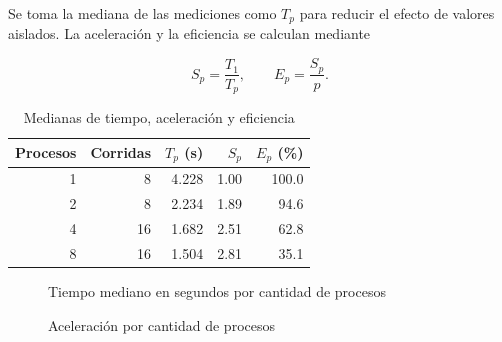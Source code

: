 \documentclass[11pt]{article}
\begin{document}
Se toma la mediana de las mediciones como $T_p$ para reducir el efecto de
valores aislados. La aceleración y la eficiencia se calculan mediante

\begin{equation}
    S_p=\frac{T_1}{T_p},
    \qquad
    E_p=\frac{S_p}{p}.
\end{equation}

\begin{table}[htbp]
    \centering
    \begin{tabular}{r|r|r|r|r}
        \hline
        Procesos & Corridas & $T_p$ (s) & $S_p$ & $E_p$ (\%) \\
        \hline
        1 & 8 & 4.228 & 1.00 & 100.0 \\
        2 & 8 & 2.234 & 1.89 & 94.6 \\
        4 & 16 & 1.682 & 2.51 & 62.8 \\
        8 & 16 & 1.504 & 2.81 & 35.1 \\
        \hline
    \end{tabular}
    \caption{Medianas de tiempo, aceleración y eficiencia}
    \label{tab:rendimiento}
\end{table}

\begin{figure}[htbp]
    \centering
    \caption{Tiempo mediano en segundos por cantidad de procesos}
    \label{fig:tiempo}
\end{figure}

\begin{figure}[htbp]
    \centering
    \caption{Aceleración por cantidad de procesos}
    \label{fig:aceleracion}
\end{figure}
\end{document}
